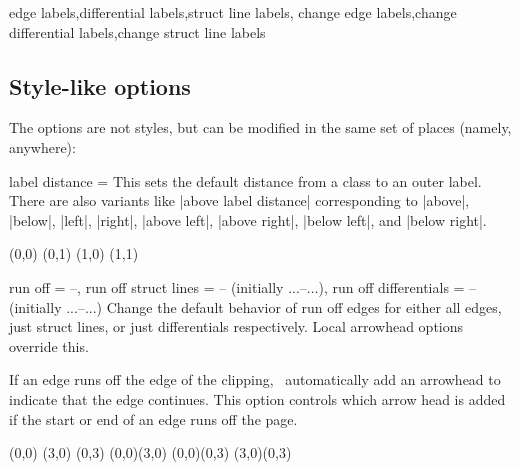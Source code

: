 \begin{sseqdata}[|| name = ex1, cohomological Serre grading]
\begin{stylekeylist}{edge labels,differential labels,struct line labels,
                change edge labels,change differential labels,change struct line labels}

\end{stylekeylist}


\subsection{Style-like options}
The options are not styles, but can be modified in the same set of places (namely, anywhere):

\begin{keylist}{label distance = }
This sets the default distance from a class to an outer label. There are also variants like |above label distance| corresponding to |above|, |below|, |left|, |right|, |above left|, |above right|, |below left|, and |below right|.
\begin{codeexample}[width = 6cm]
\begin{sseqpage}[ label distance = 0.3em,
                  right label distance = 0em,
                  no axes,yscale = 1.25 ]
\class["a" above](0,0)
(0,1)
\class["c" right](1,0)
\class["c" {right = 1em}](1,1)
\end{sseqpage}
\end{codeexample}
\end{keylist}

\begin{keylist}{run off = --,
    run off struct lines = --  (initially {...--...}),
    run off differentials = -- (initially {...--...})}
Change the default behavior of run off edges for either all edges, just struct lines, or just differentials respectively. Local arrowhead options override this.

If an edge runs off the edge of the clipping, \sseqpages\ automatically add an arrowhead to indicate that the edge continues. This option controls which arrow head is added if the start or end of an edge runs off the page.
\begin{codeexample}[width = 6cm]
\begin{sseqpage}[ x range = {0}{2}, y range = {0}{2},
                  draw orphan edges, run off = >-stealth ]
\class(0,0)
\class(3,0) \class(0,3)
\structline(0,0)(3,0)
\structline[red](0,0)(0,3)
\structline[blue](3,0)(0,3)
\end{sseqpage}
\end{codeexample}
\end{keylist}


\end{sseqdata}
